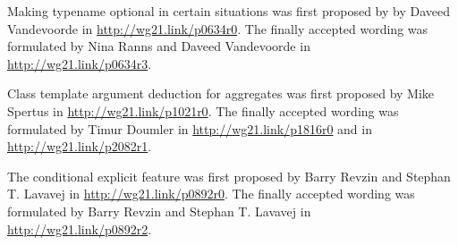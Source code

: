Making typename optional in certain situations was first proposed by by Daveed Vandevoorde in \url{http://wg21.link/p0634r0}. The finally accepted wording was formulated by Nina Ranns and Daveed Vandevoorde in \url{http://wg21.link/p0634r3}.

Class template argument deduction for aggregates was first proposed by Mike Spertus in \url{http://wg21.link/p1021r0}. The finally accepted wording was formulated by Timur Doumler in \url{http://wg21.link/p1816r0} and in \url{http://wg21.link/p2082r1}.

The conditional explicit feature was first proposed by Barry Revzin and Stephan T. Lavavej in \url{http://wg21.link/p0892r0}. The finally accepted wording was formulated by Barry Revzin and Stephan T. Lavavej in \url{http://wg21.link/p0892r2}.